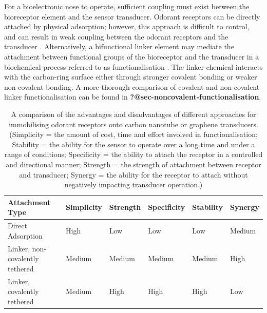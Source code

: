 \documentclass[
  a4paper,
]{scrbook}
\begin{document}
For a bioelectronic nose to operate, sufficient coupling must exist
between the bioreceptor element and the sensor transducer. Odorant
receptors can be directly attached by physical adsorption; however, this
approach is difficult to control, and can result in weak coupling
between the odorant receptors and the transducer \autocite{Dung2018}.
Alternatively, a bifunctional linker element may mediate the attachment
between functional groups of the bioreceptor and the transducer in a
biochemical process referred to as functionalisation
\autocite{Star2003a}. The linker chemical interacts with the carbon-ring
surface either through stronger covalent bonding or weaker non-covalent
bonding. A more thorough comparison of covalent and non-covalent linker
functionalisation can be found in
\textbf{?@sec-noncovalent-functionalisation}.

\hypertarget{tbl-functionalisation-types}{}
\begin{longtable}[t]{>{\raggedright\arraybackslash}p{5.4cm}>{\raggedright\arraybackslash}p{1.45cm}>{\raggedright\arraybackslash}p{1.3cm}>{\raggedright\arraybackslash}p{1.45cm}>{\raggedright\arraybackslash}p{1.3cm}>{\raggedright\arraybackslash}p{1.3cm}}
\caption{\label{tbl-functionalisation-types}A comparison of the advantages and disadvantages of different approaches
for immobilising odorant receptors onto carbon nanotube or graphene
transducers. (Simplicity = the amount of cost, time and effort involved
in functionalisation; Stability = the ability for the sensor to operate
over a long time and under a range of conditions; Specificity = the
ability to attach the receptor in a controlled and directional manner;
Strength = the strength of attachment between receptor and transducer;
Synergy = the ability for the receptor to attach without negatively
impacting transducer operation.) }\tabularnewline

\toprule
Attachment Type & Simplicity & Strength & Specificity & Stability & Synergy\\
\midrule
Direct Adsorption & High & Low & Low & Low & Medium\\
Linker, non-covalently tethered & Medium & Medium & Medium & Medium & High\\
Linker, covalently tethered & Medium & High & High & High & Low\\
\bottomrule
\end{longtable}

\newpage
{}
\end{document}
